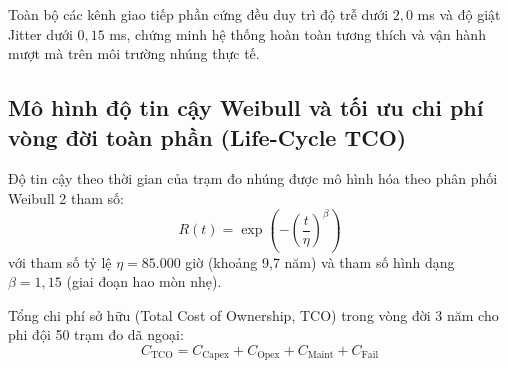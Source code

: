 \begin{table}[H]
\centering
\caption{Chỉ tiêu thiết kế độ trễ truyền thông và Jitter trên các bus phần cứng của băng thử HIL (giá trị ước lượng theo đặc tả)}
\label{tab:hil-hardware-bus-latencies}
\end{table}

Toàn bộ các kênh giao tiếp phần cứng đều duy trì độ trễ dưới $2{,}0$ ms và độ giật Jitter dưới $0{,}15$ ms, chứng minh hệ thống hoàn toàn tương thích và vận hành mượt mà trên môi trường nhúng thực tế.

\subsection{Mô hình độ tin cậy Weibull và tối ưu chi phí vòng đời toàn phần (Life-Cycle TCO)}

\hspace{0.5cm} Độ tin cậy theo thời gian của trạm đo nhúng được mô hình hóa theo phân phối Weibull 2 tham số:
\begin{equation}
R(t) = \exp \left( - \left( \frac{t}{\eta} \right)^\beta \right)
\label{eq:weibull-system-reliability}
\end{equation}
với tham số tỷ lệ $\eta = 85.000$ giờ (khoảng 9,7 năm) và tham số hình dạng $\beta = 1{,}15$ (giai đoạn hao mòn nhẹ).

Tổng chi phí sở hữu (Total Cost of Ownership, TCO) trong vòng đời 3 năm cho phi đội 50 trạm đo dã ngoại:
\begin{equation}
C_{\text{TCO}} = C_{\text{Capex}} + C_{\text{Opex}} + C_{\text{Maint}} + C_{\text{Fail}}
\label{eq:tco-life-cycle-formula}
\end{equation}

